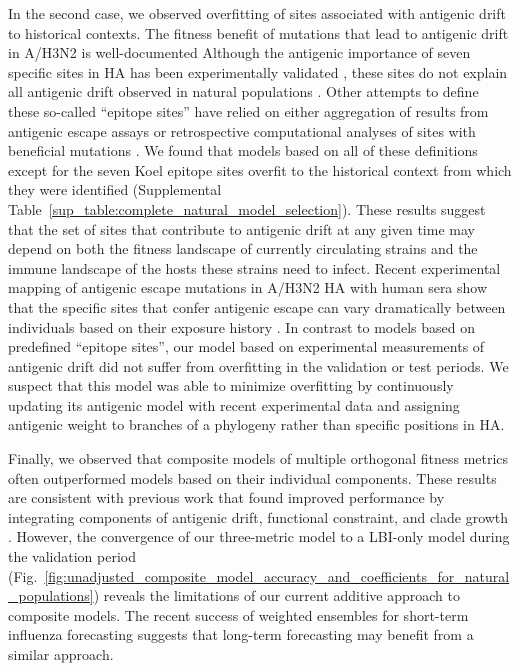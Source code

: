 In the second case, we observed overfitting of sites associated with antigenic drift to historical contexts.
The fitness benefit of mutations that lead to antigenic drift in A/H3N2 is well-documented \cite{Wiley:1981bc,Smith:2004jc,Wolf:2006da,Koel:2013jz}
Although the antigenic importance of seven specific sites in HA has been experimentally validated \cite{Koel:2013jz}, these sites do not explain all antigenic drift observed in natural populations \cite{Neher:2016hy}.
Other attempts to define these so-called ``epitope sites'' have relied on either aggregation of results from antigenic escape assays \cite{Wolf:2006da} or retrospective computational analyses of sites with beneficial mutations \cite{Shih:2007bd,Luksza:2014hj}.
We found that models based on all of these definitions except for the seven Koel epitope sites overfit to the historical context from which they were identified (Supplemental Table~\ref{sup_table:complete_natural_model_selection}).
These results suggest that the set of sites that contribute to antigenic drift at any given time may depend on both the fitness landscape of currently circulating strains and the immune landscape of the hosts these strains need to infect.
Recent experimental mapping of antigenic escape mutations in A/H3N2 HA with human sera show that the specific sites that confer antigenic escape can vary dramatically between individuals based on their exposure history \cite{Lee2019}.
In contrast to models based on predefined ``epitope sites'', our model based on experimental measurements of antigenic drift did not suffer from overfitting in the validation or test periods.
We suspect that this model was able to minimize overfitting by continuously updating its antigenic model with recent experimental data and assigning antigenic weight to branches of a phylogeny rather than specific positions in HA.

Finally, we observed that composite models of multiple orthogonal fitness metrics often outperformed models based on their individual components.
These results are consistent with previous work that found improved performance by integrating components of antigenic drift, functional constraint, and clade growth \cite{Luksza:2014hj}.
However, the convergence of our three-metric model to a LBI-only model during the validation period (Fig.~\ref{fig:unadjusted_composite_model_accuracy_and_coefficients_for_natural_populations}) reveals the limitations of our current additive approach to composite models.
The recent success of weighted ensembles for short-term influenza forecasting \cite{Reich:2019bq} suggests that long-term forecasting may benefit from a similar approach.

